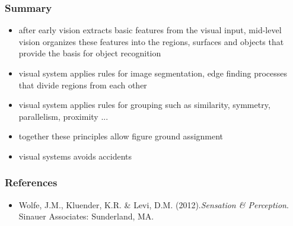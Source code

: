 \documentclass[]{beamer}
\begin{document}
\begin{frame}
 \frametitle{Summary}
\begin{itemize}
\setlength{\itemsep}{5pt}
 \item after early vision extracts basic features from the visual input, mid-level vision organizes these features into the regions, surfaces and objects that provide the basis for object recognition
 \item visual system applies rules for image segmentation, edge finding processes that divide regions from each other
 \item visual system applies rules for grouping such as similarity, symmetry, parallelism, proximity ...
 \item together these principles allow figure ground assignment
 \item visual systems avoids accidents
\end{itemize}

\end{frame}




\begin{frame}
 \frametitle{References}
\begin{small}
\begin{itemize}
 \item  Wolfe, J.M., Kluender, K.R. \& Levi, D.M. (2012).\textit{Sensation \& Perception}. Sinauer Associates: Sunderland, MA. 
\end{itemize}
\end{small}
\end{frame}
\end{document}
